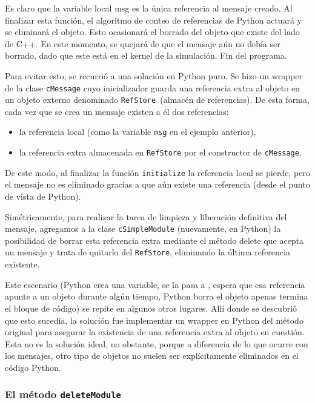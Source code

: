 \documentclass[]{article}
\begin{document}
\inputminted{Python}{codelistings/txc1.py}

Es claro que la variable local msg es la única referencia al mensaje creado. Al
finalizar esta función, el algoritmo de conteo de referencias de Python actuará
y se eliminará el objeto. Esto ocasionará el borrado del objeto que existe del
lado de C++. En este momento, \omnetpp{} se quejará de que el mensaje aún no debía
ser borrado, dado que este está en el kernel de la simulación. Fin del
programa.

Para evitar esto, se recurrió a una solución en Python puro. Se hizo un wrapper
de la clase \verb!cMessage! cuyo inicializador guarda una referencia extra al objeto
en un objeto externo denominado \verb!RefStore !(almacén de referencias). De esta
forma, cada vez que se crea un mensaje existen a él dos referencias:

\begin{itemize}
    \item la referencia local (como la variable \verb!msg! en el ejemplo
anterior),

    \item la referencia extra almacenada en \verb!RefStore! por el constructor
de \verb!cMessage!.
\end{itemize}

De este modo, al finalizar la función \verb!initialize! la referencia local se
pierde, pero el mensaje no es eliminado gracias a que aún existe una referencia
(desde el punto de vista de Python). 

Simétricamente, para realizar la tarea de limpieza y liberación definitiva del
mensaje, agregamos a la clase \verb!cSimpleModule! (nuevamente, en Python) la
posibilidad de borrar esta referencia extra mediante el método delete que
acepta un mensaje y trata de quitarlo del \verb!RefStore!, eliminando la última
referencia existente.

Este escenario (Python crea una variable, se la pasa a \omnetpp{}, \omnetpp{}
espera que esa referencia apunte a un objeto durante algún tiempo, Python borra
el objeto apenas termina el bloque de código) se repite en algunos otros
lugares. Allí donde se descubrió que esto sucedía, la solución fue implementar
un wrapper en Python del método original para asegurar la existencia de una
referencia extra al objeto en cuestión. Esta no es la solución ideal, no
obstante, porque a diferencia de lo que ocurre con los mensajes, otro tipo de
objetos no suelen ser explícitamente eliminados en el código Python.

\subsubsection{El método \texttt{deleteModule}}
\end{document}
